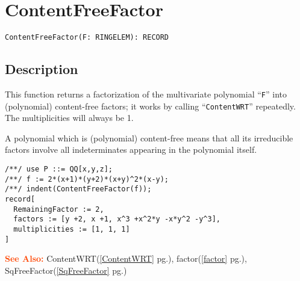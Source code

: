 \documentclass[a4paper]{mybook}
\newenvironment{command}{}{} %
\newcommand\SeeAlso{\par\textcolor{OrangeRed}{\textbf{\large See Also: }}}
\begin{document}
\section{ContentFreeFactor}
\label{ContentFreeFactor}
\begin{command} %


\begin{Verbatim}[label=syntax, rulecolor=\color{MidnightBlue},
frame=single]
ContentFreeFactor(F: RINGELEM): RECORD
\end{Verbatim}


\subsection*{Description}

This function returns a factorization of the multivariate polynomial ``\verb&F&''
into (polynomial) content-free factors; it works by calling ``\verb&ContentWRT&''
repeatedly.  The multiplicities will always be 1.
\par 
A polynomial which is (polynomial) content-free means that all its irreducible
factors involve all indeterminates appearing in the polynomial itself.
\begin{Verbatim}[label=example, rulecolor=\color{PineGreen}, frame=single]
/**/ use P ::= QQ[x,y,z];
/**/ f := 2*(x+1)*(y+2)*(x+y)^2*(x-y);
/**/ indent(ContentFreeFactor(f));
record[
  RemainingFactor := 2,
  factors := [y +2, x +1, x^3 +x^2*y -x*y^2 -y^3],
  multiplicities := [1, 1, 1]
]
\end{Verbatim}


\SeeAlso %
  ContentWRT(\ref{ContentWRT} pg.\pageref{ContentWRT}), 
    factor(\ref{factor} pg.\pageref{factor}), 
    SqFreeFactor(\ref{SqFreeFactor} pg.\pageref{SqFreeFactor})
\end{command} %
\end{document}
